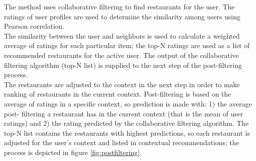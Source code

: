 The method uses collaborative filtering to find restaurants for the
user\cite{ramirez2013restaurant}. The ratings of user profiles are
used to determine the similarity among users using Pearson
correlation.\\ The similarity between the user and  neighbors is
used to calculate a weighted average of ratings for each particular
item;  the top-N ratings are used as a list of recommended restaurants
for the active user. The output of the collaborative filtering
algorithm (top-N list) is supplied to the next step of the 
post-filtering process. \\The restaurants are adjusted to the context in
the next step in order to make ranking of restaurants in the current
context. Post-filtering is based on the average of ratings in a
specific context, so prediction is made with: 1) the average post-
filtering a restaurant has in the current context (that is the mean of
user ratings) and 2) the rating predicted by the collaborative
filtering algorithm. The top-N list contains the restaurants with
highest predictions, so each restaurant is adjusted for the user’s
context and listed in contextual recommendations; the process is
depicted in figure \ref{fig:postfiltering}.

